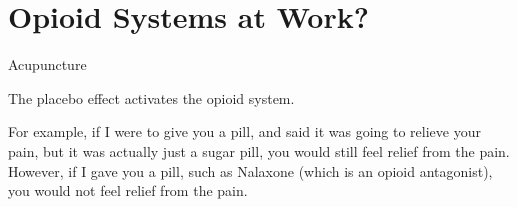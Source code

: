 \section{Opioid Systems at Work?}

\begin{coloredlist}
    \item Acupuncture
    \begin{coloredlist}
        \item 
    \end{coloredlist}
    \item The placebo effect activates the opioid system.
    \item For example, if I were to give you a pill, and said it was going to relieve your pain, but it was actually just a sugar pill, you would still feel relief from the pain. However, if I gave you a pill, such as Nalaxone (which is an opioid antagonist), you would not feel relief from the pain. 
\end{coloredlist}

